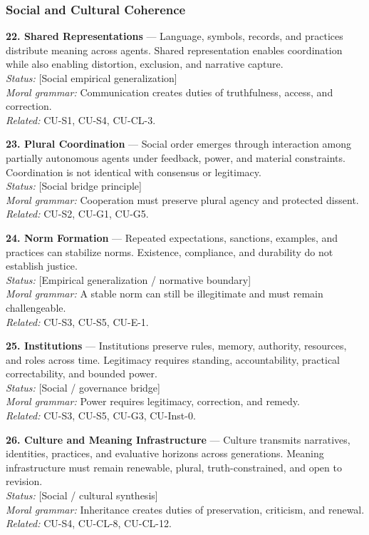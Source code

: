 \documentclass[
  11pt,
]{article}
\begin{document}
\subsubsection{Social and Cultural
Coherence}\label{social-and-cultural-coherence}

\textbf{22. Shared Representations} --- Language, symbols, records, and
practices distribute meaning across agents. Shared representation
enables coordination while also enabling distortion, exclusion, and
narrative capture.\\
\emph{Status:} {[}Social empirical generalization{]}\\
\emph{Moral grammar:} Communication creates duties of truthfulness,
access, and correction.\\
\emph{Related:} CU-S1, CU-S4, CU-CL-3.

\textbf{23. Plural Coordination} --- Social order emerges through
interaction among partially autonomous agents under feedback, power, and
material constraints. Coordination is not identical with consensus or
legitimacy.\\
\emph{Status:} {[}Social bridge principle{]}\\
\emph{Moral grammar:} Cooperation must preserve plural agency and
protected dissent.\\
\emph{Related:} CU-S2, CU-G1, CU-G5.

\textbf{24. Norm Formation} --- Repeated expectations, sanctions,
examples, and practices can stabilize norms. Existence, compliance, and
durability do not establish justice.\\
\emph{Status:} {[}Empirical generalization / normative boundary{]}\\
\emph{Moral grammar:} A stable norm can still be illegitimate and must
remain challengeable.\\
\emph{Related:} CU-S3, CU-S5, CU-E-1.

\textbf{25. Institutions} --- Institutions preserve rules, memory,
authority, resources, and roles across time. Legitimacy requires
standing, accountability, practical correctability, and bounded power.\\
\emph{Status:} {[}Social / governance bridge{]}\\
\emph{Moral grammar:} Power requires legitimacy, correction, and
remedy.\\
\emph{Related:} CU-S3, CU-S5, CU-G3, CU-Inst-0.

\textbf{26. Culture and Meaning Infrastructure} --- Culture transmits
narratives, identities, practices, and evaluative horizons across
generations. Meaning infrastructure must remain renewable, plural,
truth-constrained, and open to revision.\\
\emph{Status:} {[}Social / cultural synthesis{]}\\
\emph{Moral grammar:} Inheritance creates duties of preservation,
criticism, and renewal.\\
\emph{Related:} CU-S4, CU-CL-8, CU-CL-12.
\end{document}
